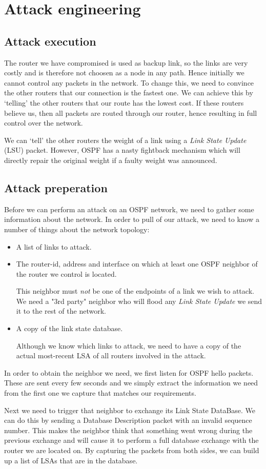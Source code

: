 \documentclass[11pt,a4paper,oneside]{article}
\newcommand{\lsection}[2]{\section{#1}\label{sec:#2}}
\newcommand{\lsubsection}[2]{\subsection{#1}\label{sec:#2}}
\begin{document}
    \lsection{Attack engineering}{attack}


    \lsubsection{Attack execution}{attack_exec}
    The router we have compromised is used as backup link, so the links are very costly and is therefore not choosen as a node in any path. Hence initially we cannot control any packets in the network. To change this, we need to convince the other routers that our connection is the fastest one. We can achieve this by `telling' the other routers that our route has the lowest cost. If these routers believe us, then all packets are routed through our router, hence resulting in full control over the network.

    We can `tell' the other routers the weight of a link using a \textit{Link State Update} (LSU) packet. However, OSPF has a nasty fightback mechanism which will directly repair the original weight if a faulty weight was announced.

    \lsubsection{Attack preperation}{attack_prep}
    Before we can perform an attack on an OSPF network, we need to gather some information about the network.
    In order to pull of our attack, we need to know a number of things about the network topology:
    \begin{itemize}
        \item A list of links to attack.
        \item The router-id, address and interface on which at least one OSPF neighbor of the router we control is located.

        This neighbor must \textit{not} be one of the endpoints of a link we wish to attack.
        We need a "3rd party" neighbor who will flood any \textit{Link State Update} we send it to the rest of the network.
        \item A copy of the link state database.

        Although we know which links to attack, we need to have a copy of the actual most-recent LSA of all routers involved in the attack.
    \end{itemize}

    In order to obtain the neighbor we need, we first listen for OSPF hello packets.
    These are sent every few seconds and we simply extract the information we need from the first one we capture that matches our requirements.

    Next we need to trigger that neighbor to exchange its Link State DataBase.
    We can do this by sending a Database Description packet with an invalid sequence number.
    This makes the neighbor think that something went wrong during the previous exchange and will cause it to perform a full database exchange with the router we are located on.
    By capturing the packets from both sides, we can build up a list of LSAs that are in the database.
\end{document}
